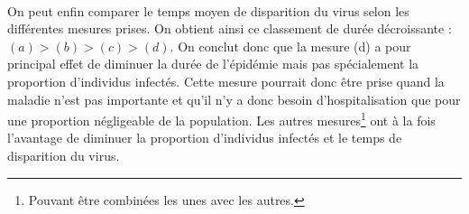 \documentclass[a4paper, 12pt, oneside]{article}
\begin{document}
\paragraph{} On peut enfin comparer le temps moyen de disparition du virus selon les différentes mesures prises. On obtient ainsi ce classement de durée décroissante : $(a) > (b) > (c) > (d)$. On conclut donc que la mesure (d) a pour principal effet de diminuer la durée de l'épidémie mais pas spécialement la proportion d'individus infectés. Cette mesure pourrait donc être prise quand la maladie n'est pas importante et qu'il n'y a donc besoin d'hospitalisation que pour une proportion négligeable de la population. Les autres mesures\footnote{Pouvant être combinées les unes avec les autres.} ont à la fois l'avantage de diminuer la proportion d'individus infectés et le temps de disparition du virus.
\end{document}
